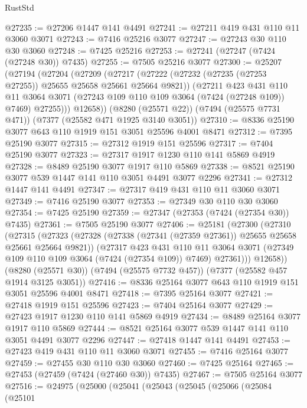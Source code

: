 \begin{lexlean}{RustStd}
\begin{coremodule}
@27235 := @27206 @1447 @141 @4491
@27241 := @27211 @419 @431 @110 @11 @3060 @3071
@27243 := @7416 @25216 @3077
@27247 := @27243 @30 @110 @30 @3060
@27248 := @7425 @25216
@27253 := @27241 (@27247 (@7424 (@27248 @30)) @7435)
@27255 := @7505 @25216 @3077
@27300 := @25207
    (@27194
      (@27204
        (@27209
          (@27217
            (@27222 (@27232 (@27235 (@27253 @27255)) @25655 @25658 @25661 @25664 @9821))
            (@27211
              @423
              @431
              @110
              @11
              @3064
              @3071
              (@27243 @109 @110 @109 @3064 (@7424 (@27248 @109)) @7469)
              @27255)))
        @12658))
    (@8280 (@25571 @22))
    (@7494 (@25575 @7731 @471))
    (@7377 (@25582 @471 @1925 @3140 @3051))
@27310 := @8336 @25190 @3077 @643 @110 @1919 @151 @3051 @25596 @4001 @8471
@27312 := @7395 @25190 @3077
@27315 := @27312 @1919 @151 @25596
@27317 := @7404 @25190 @3077
@27323 := @27317 @1917 @1230 @110 @141 @5869 @4919
@27328 := @8489 @25190 @3077 @1917 @110 @5869
@27338 := @8521 @25190 @3077 @539 @1447 @141 @110 @3051 @4491 @3077 @2296
@27341 := @27312 @1447 @141 @4491
@27347 := @27317 @419 @431 @110 @11 @3060 @3071
@27349 := @7416 @25190 @3077
@27353 := @27349 @30 @110 @30 @3060
@27354 := @7425 @25190
@27359 := @27347 (@27353 (@7424 (@27354 @30)) @7435)
@27361 := @7505 @25190 @3077
@27406 := @25181
    (@27300
      (@27310
        (@27315
          (@27323
            (@27328 (@27338 (@27341 (@27359 @27361)) @25655 @25658 @25661 @25664 @9821))
            (@27317
              @423
              @431
              @110
              @11
              @3064
              @3071
              (@27349 @109 @110 @109 @3064 (@7424 (@27354 @109)) @7469)
              @27361)))
        @12658))
    (@8280 (@25571 @30))
    (@7494 (@25575 @7732 @457))
    (@7377 (@25582 @457 @1914 @3125 @3051))
@27416 := @8336 @25164 @3077 @643 @110 @1919 @151 @3051 @25596 @4001 @8471
@27418 := @7395 @25164 @3077
@27421 := @27418 @1919 @151 @25596
@27423 := @7404 @25164 @3077
@27429 := @27423 @1917 @1230 @110 @141 @5869 @4919
@27434 := @8489 @25164 @3077 @1917 @110 @5869
@27444 := @8521 @25164 @3077 @539 @1447 @141 @110 @3051 @4491 @3077 @2296
@27447 := @27418 @1447 @141 @4491
@27453 := @27423 @419 @431 @110 @11 @3060 @3071
@27455 := @7416 @25164 @3077
@27459 := @27455 @30 @110 @30 @3060
@27460 := @7425 @25164
@27465 := @27453 (@27459 (@7424 (@27460 @30)) @7435)
@27467 := @7505 @25164 @3077
@27516 := @24975
    (@25000
      (@25041
        (@25043
          (@25045
            (@25066
              (@25084
                (@25101

\end{coremodule}
\end{lexlean}
